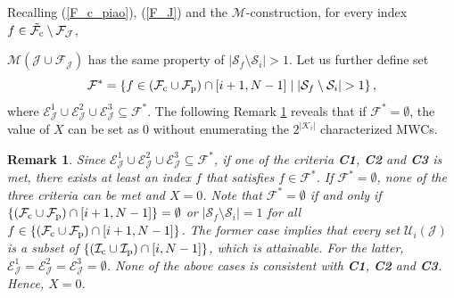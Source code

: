 \documentclass[12pt, draftclsnofoot, peerreview, onecolumn]{IEEEtran}
\theoremstyle{noparent}
\newtheorem{remark}[theorem]{\textbf{Remark}}
\begin{document}
Recalling (\ref{F_c_piao}), (\ref{F_J}) and the $\mathcal{M}$-construction, 
for every index $f \in \tilde{\mathcal{F}_{\rm c}}\setminus\mathcal{F}_{\mathcal{J}}$, 

$\mathcal{M}(\mathcal{J} \cup \mathcal{F}_\mathcal{J})$ has 
the same property of $|\mathcal{S}_f\setminus\mathcal{S}_i|>1$.
Let us further define set 
$$\mathcal{F}^{*}=\left\{f \in (\mathcal{F}_{\rm c}\cup\mathcal{F}_{\rm p}) \cap [i+1,N-1]  \mid  
\left|\mathcal{S}_f \setminus \mathcal{S}_i\right|>1\right\},$$
where $\mathcal{E}_{\mathcal{J}}^{1}\cup\mathcal{E}_{\mathcal{J}}^{2}\cup\mathcal{E}_{\mathcal{J}}^{3}
\subseteq \mathcal{F}^{*}$.
The following Remark \ref{remark_F_set} reveals that 
if $\mathcal{F}^{*}=\emptyset$, the value of $X$ can be set as $0$
without enumerating the $2^{|\mathcal{K}_i|}$ characterized MWCs. 

\begin{remark}
    \label{remark_F_set}
    Since $\mathcal{E}_{\mathcal{J}}^{1}\cup\mathcal{E}_{\mathcal{J}}^{2}\cup\mathcal{E}_{\mathcal{J}}^{3}
    \subseteq \mathcal{F}^{*}$, if one of the criteria \textbf{C1}, \textbf{C2} and \textbf{C3} is met, 
    there exists at least an index $f$ that satisfies $f\in\mathcal{F}^{*}$.
    If $\mathcal{F}^{*}=\emptyset$, none of the three criteria can be met and $X=0$.
    Note that $\mathcal{F}^{*}=\emptyset$ if and only if 
    $\{(\mathcal{F}_{\rm c}\cup\mathcal{F}_{\rm p}) \cap [i+1,N-1]\}=\emptyset$ or
    $\left|\mathcal{S}_f \setminus \mathcal{S}_i\right|=1$ for all $f\in \{(\mathcal{F}_{\rm c}\cup\mathcal{F}_{\rm p}) \cap [i+1,N-1]\}$.
    The former case implies that every set $\mathcal{U}_i(\mathcal{J})$ is a subset of 
    $\{(\mathcal{I}_{\rm c}\cup\mathcal{I}_{\rm p}) \cap[i,N-1]\}$, which is attainable.
    For the latter, $\mathcal{E}_{\mathcal{J}}^{1}=\mathcal{E}_{\mathcal{J}}^{2}=\mathcal{E}_{\mathcal{J}}^{3}=\emptyset$.
    None of the above cases is consistent with \textbf{C1}, \textbf{C2} and \textbf{C3}. Hence, $X=0$.
\end{remark}
\end{document}
